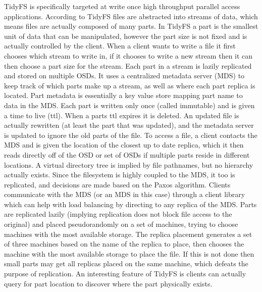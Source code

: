 TidyFS \cite{Fetterly2011} is specifically targeted at write once high
throughput parallel access applications. According to TidyFS files are
abstracted into streams of data, which means files are actually composed of
many parts. In TidyFS a part is the smallest unit of data that can be
manipulated, however the part size is not fixed and is actually controlled by
the client. When a client wants to write a file it first chooses which stream
to write in, if it chooses to write a new stream then it can then choose a
part size for the stream.  Each part in a stream is lazily replicated and
stored on multiple OSDs. It uses a centralized metadata server (MDS) to keep
track of which parts make up a stream, as well as where each part replica is
located. Part metadata is essentially a key value store mapping part name to
data in the MDS. Each part is written only once (called immutable) and is
given a time to live (ttl). When a parts ttl expires it is deleted. An updated
file is actually rewritten (at least the part that was updated), and the
metadata server is updated to ignore the old parts of the file. To access a
file, a client contacts the MDS and is given the location of the closest up to
date replica, which it then reads directly off of the OSD or set of OSDs if
multiple parts reside in different locations. A virtual directory tree is
implied by file pathnames, but no hierarchy actually exists. Since the
filesystem is highly coupled to the MDS, it too is replicated, and decisions
are made based on the Paxos algorithm. Clients communicate with the MDS (or an
MDS in this case) through a client library which can help with load balancing
by directing to any replica of the MDS. Parts are replicated lazily (implying
replication does not block file access to the original) and placed
pseudorandomly on a set of machines, trying to choose machines with the most
available storage. The replica placement generates a set of three machines
based on the name of the replica to place, then chooses the machine with the
most available storage to place the file. If this is not done then small parts
may get all replicas placed on the same machine, which defeats the purpose of
replication. An interesting feature of TidyFS is clients can actually query
for part location to discover where the part physically exists.


